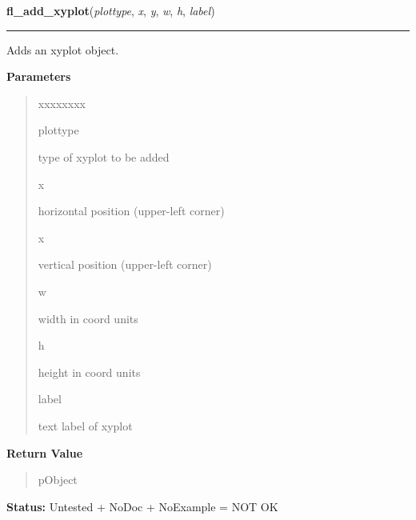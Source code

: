     \label{xformslib:library:fl_add_xyplot}

    \vspace{0.5ex}

\hspace{.8\funcindent}\begin{boxedminipage}{\funcwidth}

    \raggedright \textbf{fl\_add\_xyplot}(\textit{plottype}, \textit{x}, \textit{y}, \textit{w}, \textit{h}, \textit{label})

    \vspace{-1.5ex}

    \rule{\textwidth}{0.5\fboxrule}
\setlength{\parskip}{2ex}
    Adds an xyplot object.

\setlength{\parskip}{1ex}
      \textbf{Parameters}
      \vspace{-1ex}

      \begin{quote}
        \begin{Ventry}{xxxxxxxx}

          \item[plottype]

          type of xyplot to be added

          \item[x]

          horizontal position (upper-left corner)

          \item[x]

          vertical position (upper-left corner)

          \item[w]

          width in coord units

          \item[h]

          height in coord units

          \item[label]

          text label of xyplot

        \end{Ventry}

      \end{quote}

      \textbf{Return Value}
    \vspace{-1ex}

      \begin{quote}
      pObject

      \end{quote}

\textbf{Status:} Untested + NoDoc + NoExample = NOT OK



    \end{boxedminipage}


